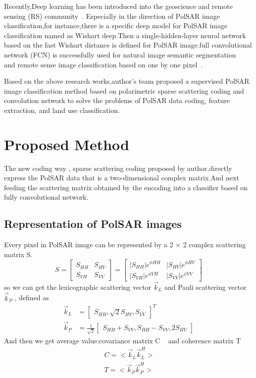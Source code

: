 \documentclass[10pt,twocolumn,letterpaper]{article}
\begin{document}
	
	Recently,Deep learning has been introduced into the geoscience and remote sensing (RS) community~\cite{Pol-sar2016_4,synthetic2016_5,Spectralspatial2016_6}.
Especially in the direction of PolSAR image classification,for instance,there is a
specific deep model for PolSAR image classification named as Wishart deep.Then a single-hidden-layer neural network based on the fast Wishart distance is defined for PolSAR image.full convolutional network (FCN) is successfully used for natural image semantic segmentation ~\cite{convolutional2017_7,Semantic2016_8} and remote sense image classification based on one by one pixel~\cite{Surface2017_9,Automatic2017_10}.


Based on the above research works,author's team proposed a supervised PolSAR image classification method based on polarimetric sparse scattering coding and convolution network to solve the problems of PolSAR data coding, feature extraction, and land use classification.

\section{Proposed Method}	
	The new coding way , sparse scattering coding proposed by author,directly express the PolSAR  data that is a two-dimensional complex matrix.And next feeding the scattering matrix obtained by the encoding into a classifier based on fully convolutional network.
\subsection{Representation of PolSAR images}
Every pixel in PolSAR image can be represented by  a 2 × 2 complex scattering matrix S.
\begin{equation}
S = \begin{bmatrix}
S_{HH} & S_{HV}\\S_{VH} & S_{VV}
\end{bmatrix} = \begin{bmatrix}
|S_{HH}|e^{\phi HH} & |S_{HV}|e^{\phi HV} \\ |S_{VH}|e^{\phi VH} & |S_{VV}|e^{\phi VV}
\end{bmatrix}
\end{equation}
so we can get the lexicographic scattering vector $\vec{k}_{L}$ and Pauli scattering vector $\vec{k}_{P}$ , defined as
\begin{align}
\vec{k}_{L} &=  \begin{bmatrix}
S_{HH} , \sqrt{2}S_{HV},S_{VV}
\end{bmatrix}^{T} \\
\vec{k}_{P} &= \frac{1}{\sqrt{2}}\begin{bmatrix}
S_{HH} + S_{VV},S_{HH} - S_{VV},2S_{HV}
\end{bmatrix}
\end{align}
And then we get average value:covariance matrix C ~\cite{Polarimetric2009_10} and coherence matrix T
\begin{align}
~{C} = <\vec{k}_{L}\vec{k}_{L}^{H}>\\
~{T} = <\vec{k}_{P}\vec{k}_{P}^{H}>
\end{align}
\end{document}
